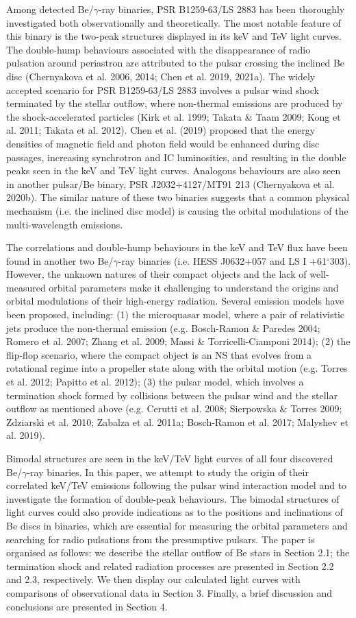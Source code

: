 \documentclass{aa}
\def\PSRB1259{PSR B1259-63/LS 2883}
\def\PSRJ2032{PSR J2032+4127/MT91 213}
\def\HESSJ0632{HESS J0632+057}
\def\LSI61{LS I +61$^{\circ}$303}
\begin{document}
Among detected Be/$\gamma$-ray binaries, \PSRB1259 has been thoroughly investigated  both observationally and theoretically. The most notable feature of this binary is the two-peak structures displayed in its keV and TeV light curves. The double-hump behaviours associated with the disappearance of radio pulsation around periastron are attributed to the pulsar crossing the inclined Be disc (Chernyakova et al. 2006, 2014; Chen et al. 2019, 2021a). The widely accepted scenario for \PSRB1259 involves a pulsar wind shock terminated by the stellar outflow, where non-thermal emissions are produced by the shock-accelerated particles (Kirk et al. 1999; Takata \& Taam 2009; Kong et al. 2011; Takata et al. 2012). Chen et al. (2019) proposed that the energy densities of magnetic field and photon field would be enhanced during disc passages, increasing synchrotron and IC luminosities, and resulting in the double peaks seen in the keV and TeV light curves.
Analogous behaviours are also seen in another pulsar/Be binary, \PSRJ2032 (Chernyakova et al. 2020b). The similar nature of these two binaries suggests that a common physical mechanism (i.e. the inclined disc model) is causing the orbital modulations of the multi-wavelength emissions.

The correlations and double-hump behaviours in the keV and TeV flux have been found in another two Be/$\gamma$-ray binaries (i.e. \HESSJ0632 and \LSI61). However, the unknown natures of their compact objects and the lack of well-measured orbital parameters make it challenging to understand the origins and orbital modulations of their high-energy radiation.
Several emission models have been proposed, including:
(1) the microquasar model, where a pair of relativistic jets produce the non-thermal emission (e.g. Bosch-Ramon \& Paredes 2004; Romero et al. 2007; Zhang et al. 2009; Massi \& Torricelli-Ciamponi 2014);
(2) the flip-flop scenario, where the compact object is an NS that evolves from a rotational regime into a propeller state along with the orbital motion (e.g. Torres et al. 2012; Papitto et al. 2012);
(3) the pulsar model, which involves a termination shock formed by collisions between the pulsar wind and the  stellar outflow as mentioned above (e.g. Cerutti et al. 2008; Sierpowska \& Torres 2009; Zdziarski et al. 2010; Zabalza et al. 2011a; Bosch-Ramon et al. 2017; Malyshev et al. 2019).

Bimodal structures are seen in the keV/TeV light curves of all four discovered Be/$\gamma$-ray binaries. In this paper, we attempt to study the origin of their correlated keV/TeV emissions following the pulsar wind interaction model and to investigate the formation of double-peak behaviours. The bimodal structures of light curves could also provide indications as to the positions and inclinations of Be discs in binaries, which are essential for measuring the orbital parameters and searching for radio pulsations from the presumptive pulsars.
The paper is organised as follows: we describe the stellar outflow of Be stars in Section 2.1; the termination shock and related radiation processes are presented in Section 2.2 and 2.3, respectively. We then display our calculated light curves with comparisons of observational data in Section 3. Finally, a brief discussion and conclusions are presented in Section 4.
\end{document}
